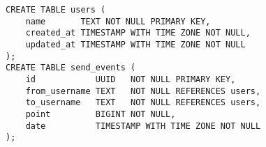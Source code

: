 \documentclass[../../../../main]{subfiles}
\begin{document}
    \begin{mdframed}
        \begin{verbatim}
CREATE TABLE users (
    name       TEXT NOT NULL PRIMARY KEY,
    created_at TIMESTAMP WITH TIME ZONE NOT NULL,
    updated_at TIMESTAMP WITH TIME ZONE NOT NULL
);
CREATE TABLE send_events (
    id            UUID   NOT NULL PRIMARY KEY,
    from_username TEXT   NOT NULL REFERENCES users,
    to_username   TEXT   NOT NULL REFERENCES users,
    point         BIGINT NOT NULL,
    date          TIMESTAMP WITH TIME ZONE NOT NULL
);
        \end{verbatim}
    \end{mdframed}
    \label{fig:web_api-table-definication}
\end{document}
